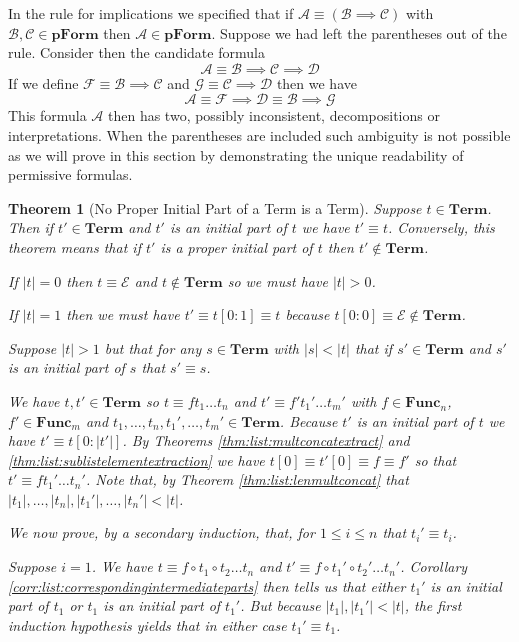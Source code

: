 \documentclass[12pt]{article}
\theoremstyle{break}
\theoremstyle{break}
\newtheorem{theorem}{Theorem}[section]
\theoremstyle{break}
\theoremstyle{break}
\theoremstyle{break}
\newtheorem{informal definition}[definition]{Informal Definition}
\newcommand{\mc}[1]{\mathcal{#1}}
\begin{document}
In the rule for implications we specified that if $\mc{A}\equiv (\mc{B}\implies \mc{C})$ with $\mc{B},\mc{C}\in\textbf{pForm}$ then $\mc{A}\in\textbf{pForm}$.
Suppose we had left the parentheses out of the rule.
Consider then the candidate formula
$$
\mc{A}\equiv \mc{B}\implies \mc{C}\implies \mc{D}
$$
If we define $\mc{F} \equiv \mc{B}\implies \mc{C}$ and $\mc{G}\equiv \mc{C}\implies \mc{D}$ then we have
$$
\mc{A}\equiv \mc{F}\implies \mc{D} \equiv \mc{B}\implies \mc{G}
$$
This formula $\mc{A}$ then has two, possibly inconsistent, decompositions or interpretations.
When the parentheses are included such ambiguity is not possible as we will prove in this section by demonstrating the unique readability of permissive formulas.


\begin{theorem}[No Proper Initial Part of a Term is a Term]
\label{thm:termnopropinit}
Suppose $t \in\textbf{Term}$.
Then if $t'\in\textbf{Term}$ and $t'$ is an initial part of $t$ we have $t'\equiv t$.
Conversely, this theorem means that if $t'$ is a proper initial part of $t$ then $t'\not\in\textbf{Term}$.


If $|t|=0$ then $t\equiv \mc{E}$ and $t\not \in \textbf{Term}$ so we must have $|t|>0$.

If $|t|=1$ then we must have $t'\equiv t[0:1]\equiv t$ because $t[0:0]\equiv \mc{E}\not\in\textbf{Term}$.

Suppose $|t|>1$ but that for any $s\in\textbf{Term}$ with $|s|<|t|$ that if $s'\in\textbf{Term}$  and $s'$ is an initial part of $s$ that $s'\equiv s$.

We have $t, t' \in \textbf{Term}$ so $t\equiv f t_1\ldots t_n$ and $t' \equiv f' t_1'\ldots t_m'$ with $f\in\textbf{Func}_n$, $f'\in\textbf{Func}_m$ and $t_1, \ldots,t_n,t_1',\ldots,t_m'\in\textbf{Term}$.
Because $t'$ is an initial part of $t$ we have $t' \equiv t[0:|t'|]$.
By Theorems \ref{thm:list:multconcatextract} and \ref{thm:list:sublistelementextraction} we have $t[0]\equiv t'[0] \equiv f\equiv f'$ so that $t' \equiv f t_1'\ldots t_n'$.
Note that, by Theorem \ref{thm:list:lenmultconcat} that $|t_1|,\ldots,|t_n|,|t_1'|,\ldots,|t_n'| < |t|$.

We now prove, by a secondary induction, that, for $1\le i \le n$ that $t_i'\equiv t_i$.

Suppose $i=1$.
We have $t\equiv f \circ t_1 \circ t_2\ldots t_n$ and $t' \equiv f \circ t_1' \circ t_2'\ldots t_n'$.
Corollary \ref{corr:list:correspondingintermediateparts} then tells us that either $t_1'$ is an initial part of $t_1$ or $t_1$ is an initial part of $t_1'$.
But because $|t_1|, |t_1'|<|t|$, the first induction hypothesis yields that in either case $t_1'\equiv t_1$.


\end{theorem}
\end{document}
